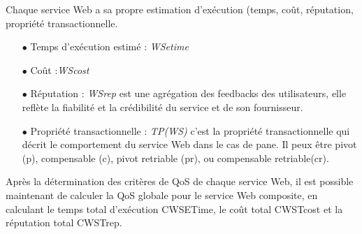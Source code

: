 Chaque service Web a sa propre estimation d'exécution (temps, coût, réputation, propriété transactionnelle. 

\begin{itemize}
\item [$\bullet$] Temps d'exécution estimé : \textit{WSetime}

\item [$\bullet$] Coût  :\textit{WScost}

\item [$\bullet$] Réputation : \textit{WSrep} est une agrégation des feedbacks des utilisateurs, elle reflète la fiabilité et la crédibilité du service et de son fournisseur.

\item [$\bullet$] Propriété transactionnelle : \textit{TP(WS)} c'est la propriété transactionnelle qui décrit le comportement du service Web dans le cas de pane. Il peux être pivot (p), compensable (c), pivot retriable (pr), ou compensable retriable(cr). 

\end{itemize}

Après la détermination des critères de QoS de chaque service Web, il est possible maintenant de calculer la QoS globale pour le service Web composite, en calculant le temps total d'exécution CWSETime, le coût total CWSTcost et la réputation total CWSTrep.

